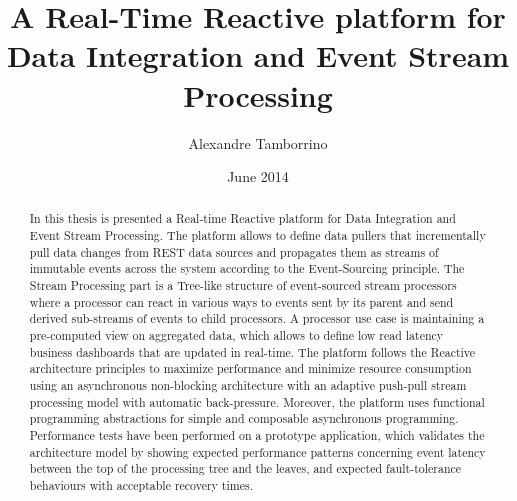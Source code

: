 \documentclass[a4paper,11pt]{kth-mag}
\title{A Real-Time Reactive platform for Data Integration and Event Stream Processing}
\author{Alexandre Tamborrino}
\date{June 2014}
\begin{document}
\frontmatter
\pagestyle{empty}
\removepagenumbers
\maketitle
{}

\begin{abstract}
In this thesis is presented a Real-time Reactive platform for Data Integration and Event Stream Processing. The platform allows to define data pullers that incrementally pull data changes from REST data sources and propagates them as streams of immutable events across the system according to the Event-Sourcing principle. The Stream Processing part is a Tree-like structure of event-sourced stream processors where a processor can react in various ways to events sent by its parent and send derived sub-streams of events to child processors. A processor use case is maintaining a pre-computed view on aggregated data, which allows to define low read latency business dashboards that are updated in real-time.
The platform follows the Reactive architecture principles to maximize performance and minimize resource consumption using an asynchronous non-blocking architecture with an adaptive push-pull stream processing model with automatic back-pressure. Moreover, the platform uses functional programming abstractions for simple and composable asynchronous programming.
Performance tests have been performed on a prototype application, which validates the architecture model by showing expected performance patterns concerning event latency between the top of the processing tree and the leaves, and expected fault-tolerance behaviours with acceptable recovery times.
\end{abstract}
\clearpage



\tableofcontents*

\mainmatter
\pagestyle{newchap}










\newpage
\printbibliography

\newpage
\listoffigures

\newpage
\listoflistings
\end{document}
